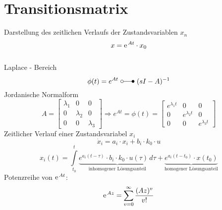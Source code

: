 \section{Transitionsmatrix}
Darstellung des zeitlichen Verlaufs der Zustandsvariablen $ x_n $
\\
\[
	x = \e^{At}\cdot x_0
\]
\\
Laplace - Bereich 
\[
	\phi(t)= e^{At} \ \laplace\ (sI-A)^{-1}
\]
Jordanische Normalform
\[
	A=\begin{bmatrix}
	\lambda_1 & 0 & 0  \\ 
	0 & \lambda_2 & 0  \\ 
	0 & 0 & \lambda_3
	\end{bmatrix}
	\Rightarrow
	e^{At}=\phi(t)=
	\begin{bmatrix}
	e^{\lambda_1t} & 0 & 0  \\ 
	0 & e^{\lambda_2t} & 0  \\ 
	0 & 0 & e^{\lambda_3t}
	\end{bmatrix}
\]
Zeitlicher Verlauf einer Zustandsvariabel $ x_i $
\[
	\dot{x}_i=a_i\cdot x_i+b_i\cdot k_0\cdot u
\]
\[
	x_i(t)=\int \limits_{t_0}^t \! \underbrace{e^{a_i(t-\tau)}\cdot b_i\cdot k_0\cdot u(\tau)  \, d\tau}_{\text{inhomogener Lösungsanteil}}
	 +\underbrace{e^{a_i(t-t_0)}\cdot x(t_0)}_{\text{homogener Lösungsanteil}}	 
\]
Potenzreihe von $\e^{At}$:
\[
	\e^{Az} = \sum_{v=0}^{\infty}\frac{(Az)^v}{v!}
\]